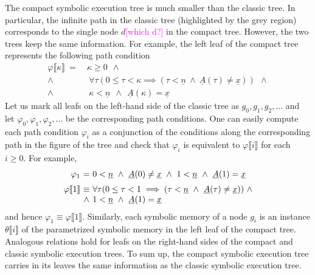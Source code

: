 \documentclass{sig-alternate}%
\newcommand{\note}[1]{{\scriptsize{{\textcolor{magenta}{[#1]}}}}}
\newcommand{\sym}[1]{\ensuremath{\underline{#1}}}
\newcommand{\prm}[1]{\ensuremath{\llbracket #1 \rrbracket}}
\begin{document}
The compact symbolic execution tree is much smaller than the classic
tree. In particular, the infinite path in the classic tree (highlighted by
the grey region) corresponds to the single node $d$\note{which d?} in the compact
tree. However, the two trees keep the same information. For example, the
left leaf of the compact tree represents the following path condition
\begin{align*}
  \varphi\prm{\kappa}~=~&\kappa\ge0~~\wedge\\
  \wedge~&~\forall\tau(0\le\tau<\kappa\implies
  (\tau<\sym{n}~\wedge~\sym{A}(\tau)\neq\sym{x}))~~\wedge\\
  \wedge~&~\kappa<\sym{n}~~\wedge~~\sym{A}(\kappa)=\sym{x}
\end{align*}
Let us mark all leafs on the left-hand side of the classic tree as
$g_0,g_1,g_2,\ldots$ and let $\varphi_0,\varphi_1,\varphi_2,\ldots$ be the
corresponding path conditions. One can easily compute each path condition
$\varphi_i$ as a conjunction of the conditions along the corresponding path
in the figure of the tree and check that $\varphi_i$ is equivalent to
$\varphi\prm{i}$ for each $i\ge0$. For example,
\[
\setlength{\arraycolsep}{0pt}
\begin{array}{rcl}
  \varphi_1&~=~
  &0<\sym{n}~\wedge~\sym{A}(0)\neq\sym{x}
   ~\wedge~1<\sym{n}~\wedge~\sym{A}(1)=\sym{x}\\[2mm]
  \varphi\prm{1}&\equiv&\forall\tau(0\le\tau<1\implies
  (\tau<\sym{n}~\wedge~\sym{A}(\tau)\neq\sym{x}))~\wedge\\
  &\wedge&1<\sym{n}~\wedge~\sym{A}(1)=\sym{x}
\end{array}
\]
and hence $\varphi_1\equiv\varphi\prm{1}$. Similarly, each symbolic memory
of a node $g_i$ is an instance $\theta\prm{i}$ of the parametrized symbolic
memory in the left leaf of the compact tree. Analogous relations hold for
leafs on the right-hand sides of the compact and classic symbolic execution
trees. To sum up, the compact symbolic execution tree carries in its leaves the
same information as the classic symbolic execution tree. 
\end{document}

